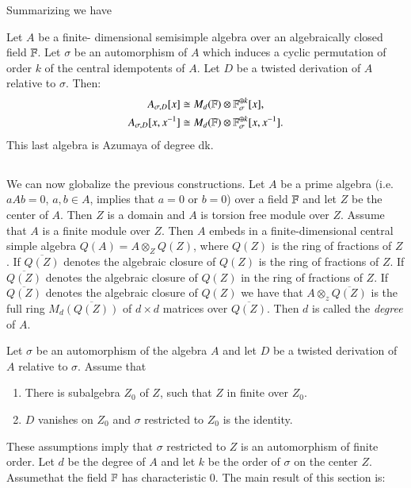 Summarizing we have

\begin{prop*}
Let $A$ be a finite- dimensional semisimple algebra over an algebraically closed field $\mathbb{F}$. Let $\sigma$ be an automorphism of $A$ which induces a cyclic permutation of order $k$ of the central idempotents of $A$. Let $D$ be a twisted derivation of $A$ relative to $\sigma$. Then:
\begin{gather*}
 A_{\sigma,D}[x] \cong M_{d}(\mathbb{F})\otimes \mathbb{F}_{\sigma}^{\oplus k}[x],\\
 A_{\sigma,D}[x, x^{-1}]\cong M_{d}(\mathbb{F})\otimes \mathbb{F}_{\sigma}^{\oplus k}[x, x^{-1}].
\end{gather*}
This last algebra is Azumaya of degree dk.
\end{prop*}

\subsection{}\label{chap4-subsec-1.5}
We can now globalize the previous constructions. Let $A$ be a prime algebra (i.e. $aAb =0$, $a, b\in A$, implies that $a=0$ or $b=0$) over a field $\mathbb{F}$ and let $Z$ be the center of $A$. Then $Z$ is a domain and $A$ is torsion free module over $Z$. Assume that $A$ is a finite module over $Z$. Then $A$ embeds in a finite-dimensional central simple algebra $Q(A) = A\otimes_{Z}Q(Z)$, where $Q(Z)$ is the ring of fractions of $Z$. If $\overline{Q(Z)}$ denotes the algebraic closure of $Q(Z)$ is the ring of fractions of $Z$. If $\overline{Q(Z)}$ denotes the algebraic closure of $Q(Z)$ in the ring of fractions of $Z$. If $\overline{Q(Z)}$ denotes the algebraic closure of $Q(Z)$ we have that $A\otimes_{z}\overline{Q(Z)}$ is the full ring $M_{d}\overline{(Q(Z))}$ of $d \times d$ matrices over $\overline{Q(Z)}$. Then $d$ is called the \textit{degree} of $A$.

Let $\sigma$ be an automorphism of the algebra $A$ and let $D$ be a twisted derivation of $A$ relative to $\sigma$. Assume that
\begin{enumerate}[(\rm a)]
\item There is subalgebra $Z_{0}$ of $Z$, such that $Z$ in finite over $Z_{0}$.
\item $D$ vanishes on $Z_{0}$ and $\sigma$ restricted to $Z_{0}$ is the identity. 
\end{enumerate}

These assumptions imply that $\sigma $ restricted to $Z$ is an automorphism of finite order. Let $d$ be the degree of $A$ and let $k$ be the order of $\sigma $ on the center $Z$. Assume\pageoriginale that the field $\mathbb{F}$ has characteristic 0. The main result of this section is:

